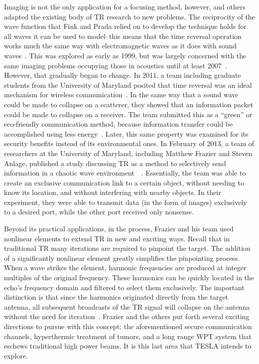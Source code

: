Imaging is not the only application for a focusing method, however, and others adapted the existing body of TR research to new problems. The reciprocity of the wave function that Fink and Prada relied on to develop the technique holds for all waves it can be used to model--this means that the time reversal operation works much the same way with electromagnetic waves as it does with sound waves~\cite{chambers_target_2007}. This was explored as early as 1999, but was largely concerned with the same imaging problems occupying those in acoustics until at least 2007~\cite{chambers_target_2007}. However, that gradually began to change. In 2011, a team including graduate students from the University of Maryland posited that time reversal was an ideal mechanism for wireless communication~\cite{wang_green_2011}. In the same way that a sound wave could be made to collapse on a scatterer, they showed that an information packet could be made to collapse on a receiver. The team submitted this as a ``green'' or eco-friendly communication method, because information transfer could be accomplished using less energy~\cite{wang_green_2011}. Later, this same property was examined for its security benefits instead of its environmental ones. In February of 2013, a team of researchers at the University of Maryland, including Matthew Frazier and Steven Anlage, published a study discussing TR as a method to selectively send information in a chaotic wave environment~\cite{nltr-wave-chaotic}~\cite{taddese_sensing_2010}. Essentially, the team was able to create an exclusive communication link to a certain object, without needing to know its location, and without interfering with nearby objects. In their experiment, they were able to transmit data (in the form of images) exclusively to a desired port, while the other port received only nonsense.

Beyond its practical applications, in the process, Frazier and his team used nonlinear elements to extend TR in new and exciting ways. Recall that in traditional TR many iterations are required to pinpoint the target. The addition of a significantly nonlinear element greatly simplifies the pinpointing process. When a wave strikes the element, harmonic frequencies are produced at integer multiples of the original frequency. These harmonics can be quickly located in the echo's frequency domain and filtered to select them exclusively. The important distinction is that since the harmonics originated directly from the target antenna, all subsequent broadcasts of the TR signal will collapse on the antenna without the need for iteration~\cite{nltr-wave-chaotic}. Frazier and the others put forth several exciting directions to pursue with this concept: the aforementioned secure communication channels, hyperthermic treatment of tumors, and a long range WPT system that eschews traditional high power beams. It is this last area that TESLA intends to explore.
